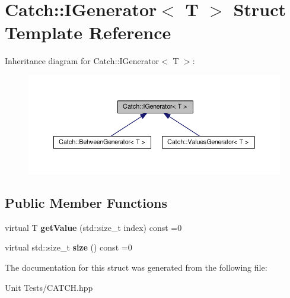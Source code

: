 \hypertarget{structCatch_1_1IGenerator}{}\section{Catch\+:\+:I\+Generator$<$ T $>$ Struct Template Reference}
\label{structCatch_1_1IGenerator}


Inheritance diagram for Catch\+:\+:I\+Generator$<$ T $>$\+:
\nopagebreak
\begin{figure}[H]
\begin{center}
\leavevmode
\includegraphics[width=350pt]{structCatch_1_1IGenerator__inherit__graph}
\end{center}
\end{figure}
\subsection*{Public Member Functions}
\begin{DoxyCompactItemize}
\item 
virtual T {\bfseries get\+Value} (std\+::size\+\_\+t index) const =0\hypertarget{structCatch_1_1IGenerator_ad69e937cb66dba3ed9429c42abf4fce3}{}\label{structCatch_1_1IGenerator_ad69e937cb66dba3ed9429c42abf4fce3}

\item 
virtual std\+::size\+\_\+t {\bfseries size} () const =0\hypertarget{structCatch_1_1IGenerator_a2e317253b03e838b6065ce69719a198e}{}\label{structCatch_1_1IGenerator_a2e317253b03e838b6065ce69719a198e}

\end{DoxyCompactItemize}


The documentation for this struct was generated from the following file\+:\begin{DoxyCompactItemize}
\item 
Unit Tests/C\+A\+T\+C\+H.\+hpp\end{DoxyCompactItemize}
